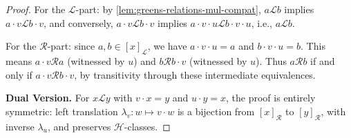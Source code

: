\begin{proof}
For the $\mathcal{L}$-part: by \ref{lem:greens-relations-mul-compat}, $a \mathcal{L} b$ implies $a \cdot v \mathcal{L} b \cdot v$, and conversely, $a \cdot v \mathcal{L} b \cdot v$ implies $a \cdot v \cdot u \mathcal{L} b \cdot v \cdot u$, i.e., $a \mathcal{L} b$.

For the $\mathcal{R}$-part: since $a, b \in [x]_{\mathcal{L}}$, we have $a \cdot v \cdot u = a$ and $b \cdot v \cdot u = b$. This means $a \cdot v \mathcal{R} a$ (witnessed by $u$) and $b \mathcal{R} b \cdot v$ (witnessed by $u$). Thus $a \mathcal{R} b$ if and only if $a \cdot v \mathcal{R} b \cdot v$, by transitivity through these intermediate equivalences.

\textbf{Dual Version.} For $x \mathcal{L} y$ with $v \cdot x = y$ and $u \cdot y = x$, the proof is entirely symmetric: left translation $\lambda_v : w \mapsto v \cdot w$ is a bijection from $[x]_{\mathcal{R}}$ to $[y]_{\mathcal{R}}$, with inverse $\lambda_u$, and preserves $\mathcal{H}$-classes.
\end{proof}

